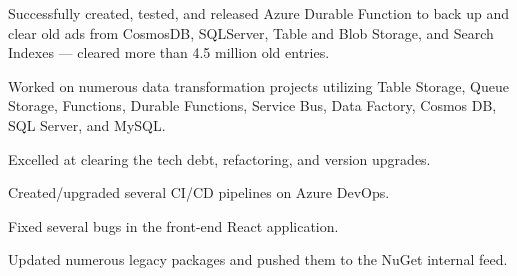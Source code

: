 \documentclass[letterpaper]{cv_12} %
\begin{document}
\begin{minipage}[t]{0.59\textwidth}
    \begin{tightitemize}
        \item Successfully created, tested, and released Azure Durable
        Function to back up and clear old ads from CosmosDB, SQLServer, Table
        and Blob
        Storage, and Search Indexes — cleared more than 4.5 million old
        entries.\@
        \item Worked on numerous data transformation projects utilizing
        Table Storage, Queue Storage, Functions, Durable Functions, Service
        Bus, Data
        Factory, Cosmos DB, SQL Server, and MySQL.\@
        \item Excelled at clearing the tech debt, refactoring, and
        version upgrades.
        \item Created/upgraded several CI/CD pipelines on Azure DevOps.
        \item Fixed several bugs in the front-end React application.
        \item Updated numerous legacy packages and pushed them to the 
        NuGet internal feed.
    \end{tightitemize}

    \sectionspace%


\end{minipage}%


\newpage %


\lastupdated%
\pagecounter%

\end{document}
